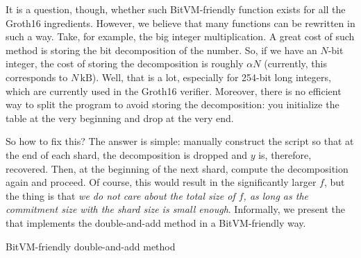 \documentclass{iacrtrans}
\begin{document}
It is a question, though, whether such BitVM-friendly function exists for all the Groth16 ingredients. However, we believe that many functions can be rewritten in such a way. Take, for example, the big integer multiplication. A great cost of such method is storing the bit decomposition of the number. So, if we have an $N$-bit integer, the cost of storing the decomposition is roughly $\alpha N$ (currently, this corresponds to $N \, \text{kB}$). Well, that is a lot, especially for 254-bit long integers, which are currently used in the Groth16 verifier. Moreover, there is no efficient way to split the program to avoid storing the decomposition: you initialize the table at the very beginning and drop at the very end.

So how to fix this? The answer is simple: manually construct the script so that at the end of each shard, the decomposition is dropped and $y$ is, therefore, recovered. Then, at the beginning of the next shard, compute the decomposition again and proceed. Of course, this would result in the significantly larger $f$, but the thing is that \textit{we do not care about the total size of $f$, as long as the commitment size with the shard size is small enough}. Informally, we present the  that implements the double-and-add method in a BitVM-friendly way.

\begin{algorithm}
  \caption{BitVM-friendly double-and-add method}\label{alg:double_and_add}
  
  

  \label{alg:double_and_add_bitvm_friendly}
  
\end{algorithm}
\end{document}
